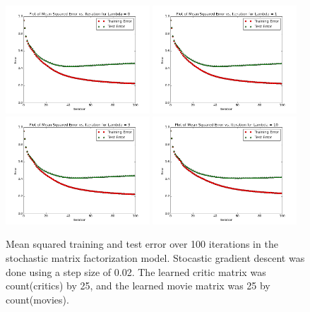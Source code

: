 \documentclass[12pt]{article}
\begin{document}
	\begin{figure}[H]
	\centering
	\includegraphics[width=0.48\textwidth]{plots/test-i100d25l0.png}
	\includegraphics[width=0.48\textwidth]{plots/test-i100d25l1.png}
	\includegraphics[width=0.48\textwidth]{plots/test-i100d25l3.png}
	\includegraphics[width=0.48\textwidth]{plots/test-i100d25l10.png}
	\caption{Mean squared training and test error over 100 iterations in the stochastic matrix factorization model. Stocastic gradient descent was done using a step size of 0.02. The learned critic matrix was count(critics) by 25, and the learned movie matrix was 25 by count(movies).}
	\label{fig:25}
	\end{figure}
\end{document}
